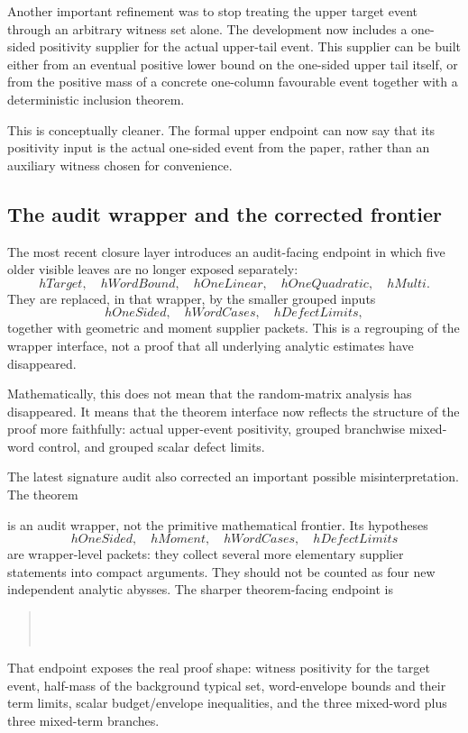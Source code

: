 \documentclass[11pt]{article}
\begin{document}
Another important refinement was to stop treating the upper target event
through an arbitrary witness set alone.  The development now includes a
one-sided positivity supplier for the actual upper-tail event.  This supplier
can be built either from an eventual positive lower bound on the one-sided
upper tail itself, or from the positive mass of a concrete one-column
favourable event together with a deterministic inclusion theorem.

This is conceptually cleaner.  The formal upper endpoint can now say that its
positivity input is the actual one-sided event from the paper, rather than an
auxiliary witness chosen for convenience.

\subsection{The audit wrapper and the corrected frontier}

The most recent closure layer introduces an audit-facing endpoint in which five
older visible leaves are no longer exposed separately:
\[
  hTarget,\quad hWordBound,\quad hOneLinear,\quad hOneQuadratic,\quad hMulti.
\]
They are replaced, in that wrapper, by the smaller grouped inputs
\[
  hOneSided,\quad hWordCases,\quad hDefectLimits,
\]
together with geometric and moment supplier packets.  This is a regrouping of
the wrapper interface, not a proof that all underlying analytic estimates have
disappeared.

Mathematically, this does not mean that the random-matrix analysis has
disappeared.  It means that the theorem interface now reflects the structure of
the proof more faithfully: actual upper-event positivity, grouped branchwise
mixed-word control, and grouped scalar defect limits.

The latest signature audit also corrected an important possible
misinterpretation.  The theorem
\begin{quote}\small\ttfamily
{}
\end{quote}
is an audit wrapper, not the primitive mathematical frontier.  Its hypotheses
\[
  hOneSided,\quad hMoment,\quad hWordCases,\quad hDefectLimits
\]
are wrapper-level packets: they collect several more elementary supplier
statements into compact arguments.  They should not be counted as four new
independent analytic abysses.  The sharper theorem-facing endpoint is
\begin{quote}\small\ttfamily
{}\\
\\
\end{quote}
That endpoint exposes the real proof shape: witness positivity for the target
event, half-mass of the background typical set, word-envelope bounds and their
term limits, scalar budget/envelope inequalities, and the three mixed-word plus
three mixed-term branches.
\end{document}
